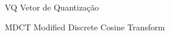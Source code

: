 \begin{siglas}
  \item[VQ] Vetor de Quantização
  \item[MDCT] Modified Discrete Cosine Transform
  \item[] 
  \item[] 
\end{siglas}
